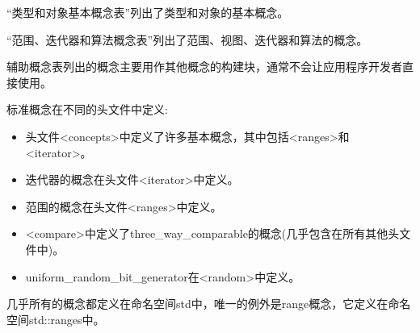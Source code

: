 
“类型和对象基本概念表”列出了类型和对象的基本概念。

“范围、迭代器和算法概念表”列出了范围、视图、迭代器和算法的概念。

辅助概念表列出的概念主要用作其他概念的构建块，通常不会让应用程序开发者直接使用。


标准概念在不同的头文件中定义:

\begin{itemize}
\item
头文件<concepts>中定义了许多基本概念，其中包括<ranges>和<iterator>。

\item
迭代器的概念在头文件<iterator>中定义。

\item
范围的概念在头文件<ranges>中定义。

\item
<compare>中定义了three\_way\_comparable的概念(几乎包含在所有其他头文件中)。

\item
uniform\_random\_bit\_generator在<random>中定义。
\end{itemize}

几乎所有的概念都定义在命名空间std中，唯一的例外是range概念，它定义在命名空间std::ranges中。

